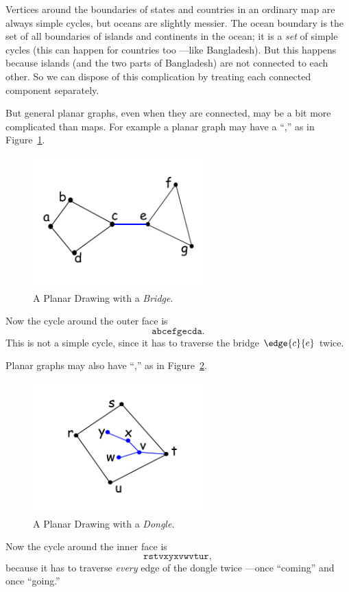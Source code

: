 Vertices around the boundaries of states and countries in an ordinary map
are always simple cycles, but oceans are slightly messier.  The ocean
boundary is the set of all boundaries of islands and continents in the
ocean; it is a \emph{set} of simple cycles (this can happen for countries
too ---like Bangladesh).  But this happens because islands (and the two
parts of Bangladesh) are not connected to each other.  So we can dispose
of this complication by treating each connected component separately.

But general planar graphs, even when they are connected, may be a bit more
complicated than maps.  For example a planar graph may have a
``,'' as in Figure~\ref{fig:bridge}.
\begin{figure}[h]
\centering \includegraphics[height=2in]{figures/edge-twice-same-face}
\caption{A Planar Drawing with a \emph{Bridge}.}
\label{fig:bridge}
\end{figure}
Now the cycle around the outer face is
\[
\mathtt{abcefgecda}.
\]
This is not a simple cycle, since it has to traverse the bridge
$\edge{c}{e}$ twice.

Planar graphs may also have ``,'' as in
Figure~\ref{fig:dongle}.
\begin{figure}[h]
\centering \includegraphics[height=2in]{figures/dongle-face}
\caption{A Planar Drawing with a \emph{Dongle}.}
\label{fig:dongle}
\end{figure}
Now the cycle around the inner face is
\[
\mathtt{rstvxyxvwvtur},
\]
because it has to traverse \emph{every} edge of the dongle twice ---once
``coming'' and once ``going.''


